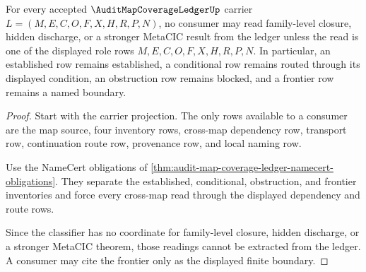 \begin{theorem}
\label{thm:audit-map-coverage-ledger-frontier-nonescape}
For every accepted $\AuditMapCoverageLedgerUp$ carrier $L=(M,E,C,O,F,X,H,R,P,N)$, no consumer may read family-level closure, hidden discharge, or a stronger MetaCIC result from the ledger unless the read is one of the displayed role rows $M,E,C,O,F,X,H,R,P,N$. In particular, an established row remains established, a conditional row remains routed through its displayed condition, an obstruction row remains blocked, and a frontier row remains a named boundary.
\end{theorem}
\begin{proof}
Start with the carrier projection. The only rows available to a consumer are the map source, four inventory rows, cross-map dependency row, transport row, continuation route row, provenance row, and local naming row.

Use the NameCert obligations of \autoref{thm:audit-map-coverage-ledger-namecert-obligations}. They separate the established, conditional, obstruction, and frontier inventories and force every cross-map read through the displayed dependency and route rows.

Since the classifier has no coordinate for family-level closure, hidden discharge, or a stronger MetaCIC theorem, those readings cannot be extracted from the ledger. A consumer may cite the frontier only as the displayed finite boundary.
\end{proof}


\begin{closurestatus}{\AuditMapCoverageLedgerUp}
  \theoryclosure{\seedClosure}
  \formalstatus{\unformalizedV}
\end{closurestatus}
